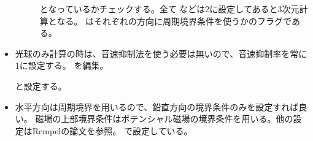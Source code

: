 \documentclass[letterpaper,10pt,dvipdfmx,report]{sphinxmanual}
\begin{document}
\begin{itemize}
\begin{description}
\begin{sphinxVerbatim}[commandchars=\\\{\}]

\end{sphinxVerbatim}

\sphinxAtStartPar
となっているかチェックする。全て  などは2に設定してあると3次元計算となる。 はそれぞれの方向に周期境界条件を使うかのフラグである。

\end{description}

\item {} \begin{description}
\sphinxAtStartPar
光球のみ計算の時は、音速抑制法を使う必要は無いので、音速抑制率を常に1に設定する。
 を編集。

\begin{sphinxVerbatim}[commandchars=\\\{\}]





\end{sphinxVerbatim}

\sphinxAtStartPar
と設定する。

\end{description}

\item {} \begin{description}
\sphinxAtStartPar
水平方向は周期境界を用いるので、鉛直方向の境界条件のみを設定すれば良い。
磁場の上部境界条件はポテンシャル磁場の境界条件を用いる。他の設定はRempelの論文を参照。
 で設定している。


\end{description}
\end{itemize}
\end{document}
